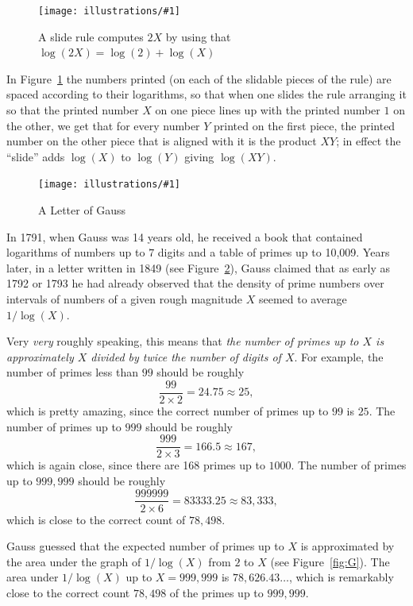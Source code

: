 \documentclass[openany]{book}
\newcommand{\ill}[3]{%
   \begin{figure}[H]%
   \vspace{-2ex}
   \centering%
   \texttt{[image: illustrations/\#1]}%
   \caption{#3}%
   \vspace{-2ex}
    \end{figure}}
\theoremstyle{plain}
\theoremstyle{definition}
\begin{document}
\ill{slide_rule}{.8}{A slide rule  computes $2X$ by using that $\log(2X)=\log(2)+\log(X)$\label{fig:slide_rule}}

In Figure~\ref{fig:slide_rule} the numbers printed (on each of the slidable pieces of the rule)
are spaced according to their logarithms, so that when one slides the
rule arranging it so that the printed  number $X$ on one piece lines up
with the printed number $1$ on the other, we get that for every number $Y$
printed on the first piece, the printed number on the other piece that
is  aligned with it is the product $XY$; in effect the ``slide'' adds
$\log(X)$ to $\log(Y)$ giving $\log(XY)$.

\ill{gauss_tables_half}{.9}{A Letter of Gauss\label{fig:gauss_letter}}

In 1791, when Gauss was 14 years old, he received a book that contained
logarithms of numbers up to $7$ digits and a table of primes up to 10{,}009.
Years later, in a letter
written in 1849 (see Figure~\ref{fig:gauss_letter}), Gauss
claimed that as early as 1792 or 1793 he had already observed that the
density of prime numbers over intervals of numbers of a given rough
magnitude $X$ seemed to average $1/\log(X)$.

 Very {\em very} roughly speaking, this
means that {\em the number of primes up to $X$ is approximately $X$ divided by
twice the number of digits of $X$}.  For example,
the number of primes less than $99$ should be roughly
$$
   \frac{99}{2\times 2} = 24.75 \approx  25,
$$
which is pretty amazing, since the correct number of
primes up to $99$ is $25$.  The number of primes up to $999$ should
be roughly
$$
   \frac{999}{2\times 3} = 166.5 \approx  167,
$$
which is again close, since there are 168 primes up to $1000$.
The number of primes up to $999{,}999$ should be roughly
$$
   \frac{999999}{2\times 6} = 83333.25 \approx  83{,}333,
$$
which is close to the correct count of $78{,}498$.

Gauss guessed that the expected number of primes up to $X$
is approximated by the area under the
graph of $1/\log(X)$ from $2$ to $X$ (see Figure~\ref{fig:G}).
The area under $1/\log(X)$ up to $X=999{,}999$ is $78{,}626.43\ldots$, which
is remarkably close to the correct count $78{,}498$ of the primes
up to $999{,}999$.
\end{document}
